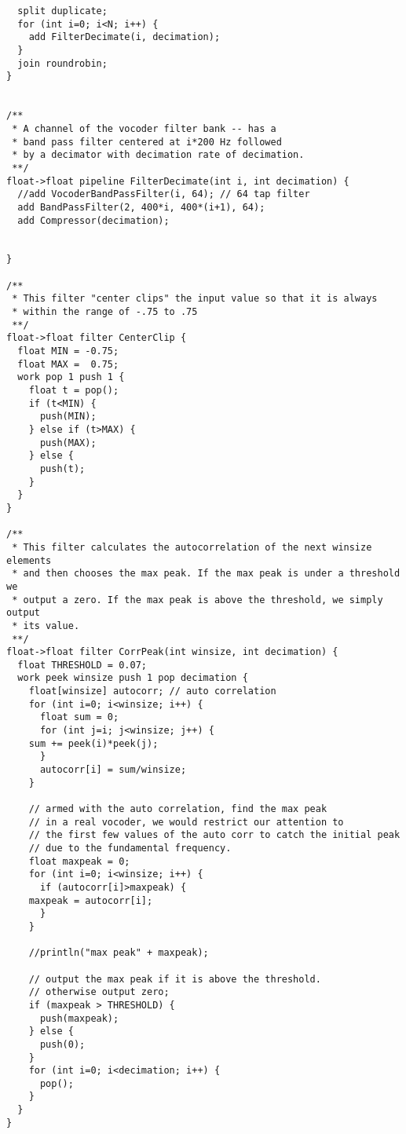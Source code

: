 \begin{scriptsize}
\begin{verbatim}
  split duplicate;
  for (int i=0; i<N; i++) {
    add FilterDecimate(i, decimation);
  }
  join roundrobin;
}


/**
 * A channel of the vocoder filter bank -- has a
 * band pass filter centered at i*200 Hz followed
 * by a decimator with decimation rate of decimation.
 **/
float->float pipeline FilterDecimate(int i, int decimation) {
  //add VocoderBandPassFilter(i, 64); // 64 tap filter
  add BandPassFilter(2, 400*i, 400*(i+1), 64);
  add Compressor(decimation);


}

/**
 * This filter "center clips" the input value so that it is always
 * within the range of -.75 to .75
 **/
float->float filter CenterClip {
  float MIN = -0.75;
  float MAX =  0.75;
  work pop 1 push 1 {
    float t = pop();
    if (t<MIN) {
      push(MIN);
    } else if (t>MAX) {
      push(MAX);
    } else {
      push(t);
    }
  }
}

/**
 * This filter calculates the autocorrelation of the next winsize elements
 * and then chooses the max peak. If the max peak is under a threshold we
 * output a zero. If the max peak is above the threshold, we simply output
 * its value.
 **/
float->float filter CorrPeak(int winsize, int decimation) {
  float THRESHOLD = 0.07;
  work peek winsize push 1 pop decimation {
    float[winsize] autocorr; // auto correlation
    for (int i=0; i<winsize; i++) {
      float sum = 0;
      for (int j=i; j<winsize; j++) {
    sum += peek(i)*peek(j);
      }
      autocorr[i] = sum/winsize;
    }

    // armed with the auto correlation, find the max peak
    // in a real vocoder, we would restrict our attention to
    // the first few values of the auto corr to catch the initial peak
    // due to the fundamental frequency.
    float maxpeak = 0;
    for (int i=0; i<winsize; i++) {
      if (autocorr[i]>maxpeak) {
    maxpeak = autocorr[i];
      }
    }

    //println("max peak" + maxpeak);

    // output the max peak if it is above the threshold.
    // otherwise output zero;
    if (maxpeak > THRESHOLD) {
      push(maxpeak);
    } else {
      push(0);
    }
    for (int i=0; i<decimation; i++) {
      pop();
    }
  }
}

\end{verbatim}
\end{scriptsize}


